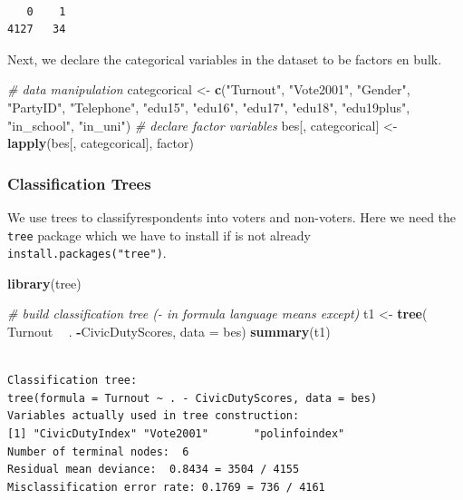 \documentclass[]{article}
\newenvironment{Shaded}{\begin{snugshade}}{\end{snugshade}}
\newcommand{\CommentTok}[1]{\textcolor[rgb]{0.56,0.35,0.01}{\textit{#1}}}
\newcommand{\DataTypeTok}[1]{\textcolor[rgb]{0.13,0.29,0.53}{#1}}
\newcommand{\KeywordTok}[1]{\textcolor[rgb]{0.13,0.29,0.53}{\textbf{#1}}}
\newcommand{\NormalTok}[1]{#1}
\newcommand{\OperatorTok}[1]{\textcolor[rgb]{0.81,0.36,0.00}{\textbf{#1}}}
\newcommand{\StringTok}[1]{\textcolor[rgb]{0.31,0.60,0.02}{#1}}
\begin{document}
\begin{verbatim}

   0    1 
4127   34 
\end{verbatim}

Next, we declare the categorical variables in the dataset to be factors en bulk.

\begin{Shaded}
\begin{Highlighting}[]
\CommentTok{# data manipulation}
\NormalTok{categcorical <-}\StringTok{ }\KeywordTok{c}\NormalTok{(}\StringTok{"Turnout"}\NormalTok{, }\StringTok{"Vote2001"}\NormalTok{, }\StringTok{"Gender"}\NormalTok{, }\StringTok{"PartyID"}\NormalTok{, }\StringTok{"Telephone"}\NormalTok{, }\StringTok{"edu15"}\NormalTok{,}
                  \StringTok{"edu16"}\NormalTok{, }\StringTok{"edu17"}\NormalTok{, }\StringTok{"edu18"}\NormalTok{, }\StringTok{"edu19plus"}\NormalTok{, }\StringTok{"in_school"}\NormalTok{, }\StringTok{"in_uni"}\NormalTok{)}
\CommentTok{# declare factor variables}
\NormalTok{bes[, categcorical] <-}\StringTok{ }\KeywordTok{lapply}\NormalTok{(bes[, categcorical], factor)}
\end{Highlighting}
\end{Shaded}

\hypertarget{classification-trees}{%
\subsubsection{Classification Trees}\label{classification-trees}}

We use trees to classifyrespondents into voters and non-voters. Here we need the \texttt{tree} package which we have to install if is not already \texttt{install.packages("tree")}.

\begin{Shaded}
\begin{Highlighting}[]
\KeywordTok{library}\NormalTok{(tree)}

\CommentTok{# build classification tree (- in formula language means except)}
\NormalTok{t1 <-}\StringTok{ }\KeywordTok{tree}\NormalTok{( Turnout }\OperatorTok{~}\StringTok{ }\NormalTok{. }\OperatorTok{-}\NormalTok{CivicDutyScores, }\DataTypeTok{data =}\NormalTok{ bes)}
\KeywordTok{summary}\NormalTok{(t1)}
\end{Highlighting}
\end{Shaded}

\begin{verbatim}

Classification tree:
tree(formula = Turnout ~ . - CivicDutyScores, data = bes)
Variables actually used in tree construction:
[1] "CivicDutyIndex" "Vote2001"       "polinfoindex"  
Number of terminal nodes:  6 
Residual mean deviance:  0.8434 = 3504 / 4155 
Misclassification error rate: 0.1769 = 736 / 4161 
\end{verbatim}
\end{document}
